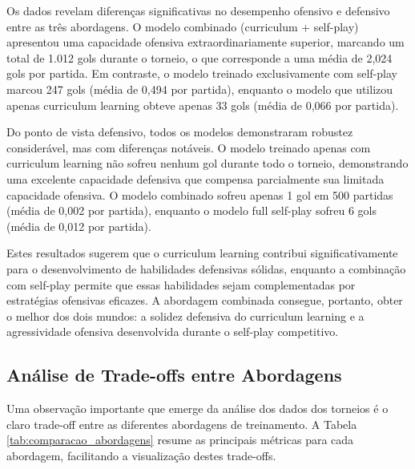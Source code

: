 Os dados revelam diferenças significativas no desempenho ofensivo e defensivo entre as três abordagens. O modelo combinado (curriculum + self-play) apresentou uma capacidade ofensiva extraordinariamente superior, marcando um total de 1.012 gols durante o torneio, o que corresponde a uma média de 2,024 gols por partida. Em contraste, o modelo treinado exclusivamente com self-play marcou 247 gols (média de 0,494 por partida), enquanto o modelo que utilizou apenas curriculum learning obteve apenas 33 gols (média de 0,066 por partida).

Do ponto de vista defensivo, todos os modelos demonstraram robustez considerável, mas com diferenças notáveis. O modelo treinado apenas com curriculum learning não sofreu nenhum gol durante todo o torneio, demonstrando uma excelente capacidade defensiva que compensa parcialmente sua limitada capacidade ofensiva. O modelo combinado sofreu apenas 1 gol em 500 partidas (média de 0,002 por partida), enquanto o modelo full self-play sofreu 6 gols (média de 0,012 por partida).

Estes resultados sugerem que o curriculum learning contribui significativamente para o desenvolvimento de habilidades defensivas sólidas, enquanto a combinação com self-play permite que essas habilidades sejam complementadas por estratégias ofensivas eficazes. A abordagem combinada consegue, portanto, obter o melhor dos dois mundos: a solidez defensiva do curriculum learning e a agressividade ofensiva desenvolvida durante o self-play competitivo.

\subsection{Análise de Trade-offs entre Abordagens}

Uma observação importante que emerge da análise dos dados dos torneios é o claro trade-off entre as diferentes abordagens de treinamento. A Tabela \ref{tab:comparacao_abordagens} resume as principais métricas para cada abordagem, facilitando a visualização destes trade-offs.

